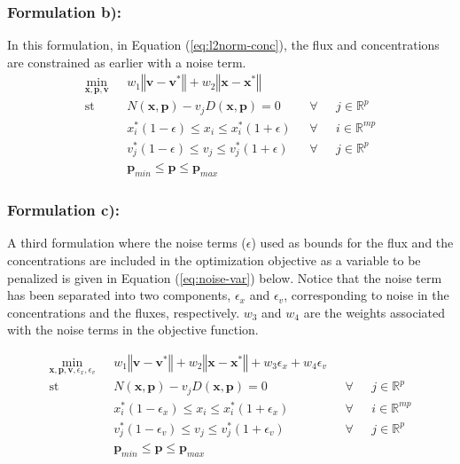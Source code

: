 \documentclass[10pt]{report}
\begin{document}
	\subsubsection{Formulation b):}	
	In this formulation, in Equation (\ref{eq:l2norm-conc}), the flux and concentrations are constrained as earlier with a noise term.	
	\begin{subequations}\label{eq:l2norm-conc}
		\begin{align}
		\underset{\mathbf{x},\mathbf{p},\mathbf{v}}{\mathrm{min}} & \text{      }w_1\left\Vert \mathbf{v}-\mathbf{v}^*\right\Vert + w_2\left\Vert \mathbf{x}-\mathbf{x}^*\right\Vert\\
		\mathrm{st}& \text{      }N(\mathbf{x},\mathbf{p}) - v_jD(\mathbf{x},\mathbf{p}) = 0 & \text{  }\forall & \text{ }j\in\mathbb{R}^p\\
		& \text{      }x^*_i(1-\epsilon)\le x_i \le x^*_i(1+\epsilon) & \text{  }\forall & \text{ }i\in\mathbb{R}^{mp}\\	
		& \text{      }v^*_j(1-\epsilon)\le v_j \le v^*_j(1+\epsilon) & \text{  }\forall & \text{ }j\in\mathbb{R}^{p}\\		
		& \text{      }\mathbf{p}_{min} \le \mathbf{p} \le \mathbf{p}_{max}
		\end{align}
	\end{subequations}
	
	\subsubsection{Formulation c):}
	A third formulation where the noise terms ($\epsilon$) used as bounds for the flux and the concentrations are included in the optimization objective as a variable to be penalized is given in Equation (\ref{eq:noise-var}) below. Notice that the noise term has been separated into two components, $\epsilon_x$ and $\epsilon_v$, corresponding to noise in the concentrations and the fluxes, respectively. $w_3$ and $w_4$ are the weights associated with the noise terms in the objective function.
	\begin{center}
		\begin{subequations}\label{eq:noise-var}
			\begin{align}
			\underset{\mathbf{x},\mathbf{p},\mathbf{v},\epsilon_x,\epsilon_v}{\mathrm{min}} & \text{      }w_1\left\Vert \mathbf{v}-\mathbf{v}^*\right\Vert + w_2\left\Vert \mathbf{x}-\mathbf{x}^*\right\Vert + w_3\epsilon_x + w_4\epsilon_v\\
			\mathrm{st}& \text{      }N(\mathbf{x},\mathbf{p}) - v_jD(\mathbf{x},\mathbf{p}) = 0 & \text{  }\forall & \text{ }j\in\mathbb{R}^p\\
			& \text{      }x^*_i(1-\epsilon_x)\le x_i \le x^*_i(1+\epsilon_x) & \text{  }\forall & \text{ }i\in\mathbb{R}^{mp}\\	
			& \text{      }v^*_j(1-\epsilon_v)\le v_j \le v^*_j(1+\epsilon_v) & \text{  }\forall & \text{ }j\in\mathbb{R}^{p}\\		
			& \text{      }\mathbf{p}_{min} \le \mathbf{p} \le \mathbf{p}_{max}
			\end{align}
		\end{subequations}
	\end{center}
	
\end{document}

